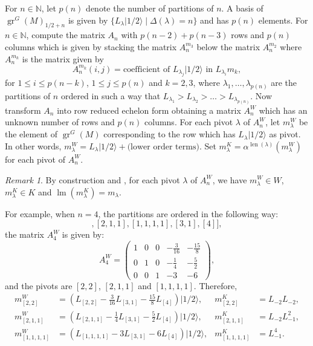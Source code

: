 \documentclass[12pt, reqno]{amsart}
\theoremstyle{remark}
\newtheorem{remark}[theorem]{Remark}
\DeclareMathOperator{\gr}{gr}
\DeclareMathOperator{\lm}{lm}
\DeclareMathOperator{\len}{len}
\newcommand{\vachalf}{|1/2\rangle}
\begin{document}
For $n \in \mathbb{N}$, let $p(n)$ denote the number of partitions of $n$.
A basis of $\gr^G(M)_{1/2 + n}$ is given by $\{L_\lambda\vachalf \mid \Delta(\lambda) = n\}$ and has $p(n)$ elements. 
For $n \in \mathbb{N}$, compute the matrix $A_n$ with $p(n - 2) + p(n - 3)$ rows and $p(n)$ columns which is given by stacking the matrix $A^{m_3}_n$ below the matrix $A^{m_2}_n$ where $A^{m_k}_n$ is the matrix given by
\begin{equation*}
  A^{m_k}_n(i, j) = \text{coefficient of }L_{\lambda_j}\vachalf\text{ in }L_{\lambda_i}m_k,
\end{equation*}
for $1 \le i \le p(n - k)$, $1 \le j \le p(n)$ and $k = 2, 3$, where $\lambda_1, \dots, \lambda_{p(n)}$ are the partitions of $n$ ordered in such a way that $L_{\lambda_1} > L_{\lambda_2} > \dots > L_{\lambda_{p(n)}}$.
Now transform $A_n$ into row reduced echelon form obtaining a matrix $A^W_n$ which has an unknown number of rows and $p(n)$ columns.
For each pivot $\lambda$ of $A^W_n$, let $m^W_\lambda$ be the element of $\gr^G(M)$ corresponding to the row which has $L_\lambda\vachalf$ as pivot.
In other words, $m^W_\lambda = L_\lambda\vachalf + \text{(lower order terms)}$.
Set $m^K_\lambda = \alpha^{\len(\lambda)}(m^W_\lambda)$ for each pivot of $A^W_n$.

\begin{remark}
  \label{rmk:5}
  By construction and , for each pivot $\lambda$ of $A^W_n$, we have $m^W_\lambda\in W$, $m^K_\lambda \in K$ and $\lm(m^K_\lambda) = m_\lambda$.
\end{remark}

For example, when $n = 4$, the partitions are ordered in the following way:
  \begin{equation*}
    [[2, 2], [2, 1, 1], [1, 1, 1, 1], [3, 1], [4]],
  \end{equation*}
  the matrix $A^W_4$ is given by:
  \begin{equation*}
    A^W_4=
    \begin{pmatrix}
      1 & 0 & 0 & -\frac{3}{16} & -\frac{15}{8} \\
      0 & 1 & 0 & -\frac{1}{4} & -\frac{5}{2} \\
      0 & 0 & 1 & -3 & -6
    \end{pmatrix},
  \end{equation*}
  and the pivots are $[2, 2]$, $[2, 1, 1]$ and $[1, 1, 1, 1]$.
  Therefore,
  \begin{align*}
    m^W_{[2, 2]} &= (L_{[2, 2]} - \tfrac{3}{16}L_{[3, 1]} - \tfrac{15}{8}L_{[4]})\vachalf, &m^K_{[2, 2]} &= L_{-2}L_{-2}, \\
    m^W_{[2, 1, 1]} &= (L_{[2, 1, 1]} - \tfrac{1}{4}L_{[3, 1]} - \tfrac{5}{2}L_{[4]})\vachalf, &m^K_{[2, 1, 1]} &= L_{-2}L_{-1}^2, \\
    m^W_{[1, 1, 1, 1]} &= (L_{[1, 1, 1, 1]} - 3L_{[3, 1]} - 6L_{[4]})\vachalf, &m^K_{[1, 1, 1, 1]} &= L_{-1}^4.
  \end{align*}
  
\end{document}
